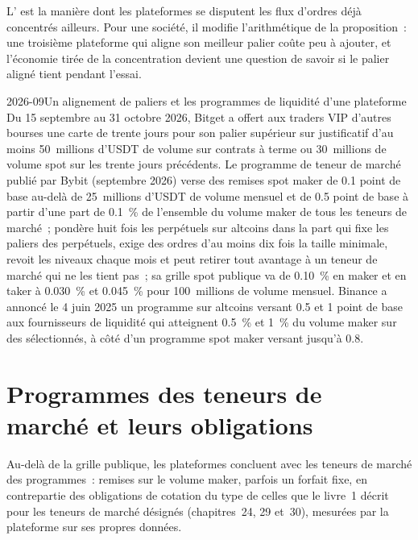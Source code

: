 L' est la manière dont les plateformes se disputent les flux d'ordres déjà concentrés ailleurs. Pour une société, il modifie l'arithmétique de la proposition~:
une troisième plateforme qui aligne son meilleur palier coûte peu à ajouter, et l'économie tirée de la concentration devient une question de savoir si le palier
aligné tient pendant l'essai.

\begin{dated}{2026-09}{Un alignement de paliers et les programmes de liquidité d'une plateforme}\label{dat:m3:getting-access-crypto-venues:programmes}
Du 15 septembre au 31 octobre 2026, Bitget a offert aux traders VIP d'autres bourses une carte de trente jours pour son palier supérieur sur justificatif d'au moins
50~millions d'USDT de volume sur contrats à terme ou 30~millions de volume spot sur les trente jours précédents. Le programme de teneur de marché publié par Bybit
(septembre 2026) verse des remises spot maker de 0.1 point de base au-delà de 25~millions d'USDT de volume mensuel et de 0.5 point de base à partir d'une part de 0.1~\% de
l'ensemble du volume maker de tous les teneurs de marché~; pondère huit fois les perpétuels sur altcoins dans la part qui fixe les paliers des perpétuels, exige des ordres d'au moins dix
fois la taille minimale, revoit les niveaux chaque mois et peut retirer tout avantage à un teneur de marché qui ne les tient pas~; sa grille spot publique
va de 0.10~\% en maker et en taker à 0.030~\% et 0.045~\% pour 100~millions de volume mensuel. Binance a annoncé le 4 juin 2025 un programme sur altcoins
versant 0.5 et 1 point de base aux fournisseurs de liquidité qui atteignent 0.5~\% et 1~\% du volume maker sur des  sélectionnés, à côté d'un programme spot maker versant jusqu'à 0.8.
\end{dated}

\section{Programmes des teneurs de marché et leurs obligations}

Au-delà de la grille publique, les plateformes concluent avec les teneurs de marché des programmes~: remises sur le volume maker, parfois un forfait fixe, en contrepartie des
obligations de cotation du type de celles que le livre~1 décrit pour les teneurs de marché désignés (chapitres~24, 29 et~30), mesurées par la plateforme sur ses propres données.

